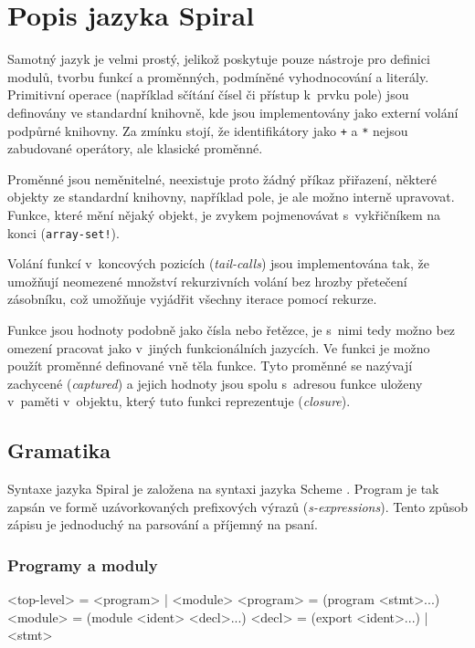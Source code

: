 \chapter{Popis jazyka Spiral}

Samotný jazyk je velmi prostý, jelikož poskytuje pouze
nástroje pro definici modulů, tvorbu funkcí a proměnných, podmíněné
vyhodnocování a literály.  Primitivní operace (například sčítání čísel či
přístup k~prvku pole) jsou definovány ve standardní knihovně, kde jsou
implementovány jako externí volání podpůrné knihovny. Za zmínku stojí, že
identifikátory jako \texttt{+} a \texttt{*} nejsou zabudované operátory, ale
klasické proměnné. 

Proměnné jsou neměnitelné, neexistuje proto žádný příkaz přiřazení, některé
objekty ze standardní knihovny, například pole, je ale možno interně upravovat.
Funkce, které mění nějaký objekt, je zvykem pojmenovávat s~vykřičníkem na konci
(\texttt{array-set!}).

Volání funkcí v~koncových pozicích (\emph{tail-calls}) jsou implementována tak,
že umožňují neomezené množství rekurzivních volání bez hrozby přetečení
zásobníku, což umožňuje vyjádřit všechny iterace pomocí rekurze.

Funkce jsou hodnoty podobně jako čísla nebo řetězce, je s~nimi tedy možno bez
omezení pracovat jako v~jiných funkcionálních jazycích. Ve funkci je možno
použít proměnné definované vně těla funkce. Tyto proměnné se nazývají zachycené
(\emph{captured}) a jejich hodnoty jsou spolu s~adresou funkce uloženy v~paměti
v~objektu, který tuto funkci reprezentuje (\emph{closure}).

\section{Gramatika}

Syntaxe jazyka Spiral je založena na syntaxi jazyka Scheme \cite{scheme7}.
Program je tak zapsán ve formě uzávorkovaných prefixových výrazů
(\emph{s-expressions}). Tento způsob zápisu je jednoduchý na parsování a
příjemný na psaní.

\subsection{Programy a moduly}
\begin{ttcode}
<top-level>   = <program> | <module>
<program>     = (program <stmt>...)
<module>      = (module <ident> <decl>...)
<decl>        = (export <ident>...) | <stmt>
\end{ttcode}

